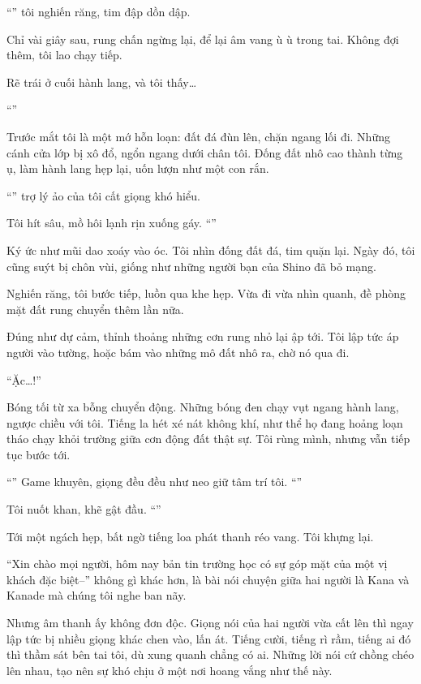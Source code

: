 \documentclass[../main.tex]{subfiles}
\begin{document}
``'' tôi nghiến răng, tim đập dồn dập.

Chỉ vài giây sau, rung chấn ngừng lại, để lại âm vang ù ù trong tai. Không đợi thêm, tôi lao chạy tiếp.

Rẽ trái ở cuối hành lang, và tôi thấy\dots

``''

Trước mắt tôi là một mớ hỗn loạn: đất đá đùn lên, chặn ngang lối đi. Những cánh cửa lớp bị xô đổ, ngổn ngang dưới chân tôi. Đống đất nhô cao thành từng ụ, làm hành lang hẹp lại, uốn lượn như một con rắn.

``'' trợ lý ảo của tôi cất giọng khó hiểu.

Tôi hít sâu, mồ hôi lạnh rịn xuống gáy. ``''

Ký ức như mũi dao xoáy vào óc. Tôi nhìn đống đất đá, tim quặn lại. Ngày đó, tôi cũng suýt bị chôn vùi, giống như những người bạn của Shino đã bỏ mạng.

Nghiến răng, tôi bước tiếp, luồn qua khe hẹp. Vừa đi vừa nhìn quanh, đề phòng mặt đất rung chuyển thêm lần nữa.

Đúng như dự cảm, thỉnh thoảng những cơn rung nhỏ lại ập tới. Tôi lập tức áp người vào tường, hoặc bám vào những mô đất nhô ra, chờ nó qua đi.

``Ặc\dots!''

Bóng tối từ xa bỗng chuyển động. Những bóng đen chạy vụt ngang hành lang, ngược chiều với tôi. Tiếng la hét xé nát không khí, như thể họ đang hoảng loạn tháo chạy khỏi trường giữa cơn động đất thật sự. Tôi rùng mình, nhưng vẫn tiếp tục bước tới.

``'' Game khuyên, giọng đều đều như neo giữ tâm trí tôi. ``''

Tôi nuốt khan, khẽ gật đầu. ``''

Tới một ngách hẹp, bất ngờ tiếng loa phát thanh réo vang. Tôi khựng lại.

``Xin chào mọi người, hôm nay bản tin trường học có sự góp mặt của một vị khách đặc biệt--'' không gì khác hơn, là bài nói chuyện giữa hai người là Kana và Kanade mà chúng tôi nghe ban nãy.

Nhưng âm thanh ấy không đơn độc. Giọng nói của hai người vừa cất lên thì ngay lập tức bị nhiều giọng khác chen vào, lấn át. Tiếng cười, tiếng rì rầm, tiếng ai đó thì thầm sát bên tai tôi, dù xung quanh chẳng có ai. Những lời nói cứ chồng chéo lên nhau, tạo nên sự khó chịu ở một nơi hoang vắng như thế này.
\end{document}
